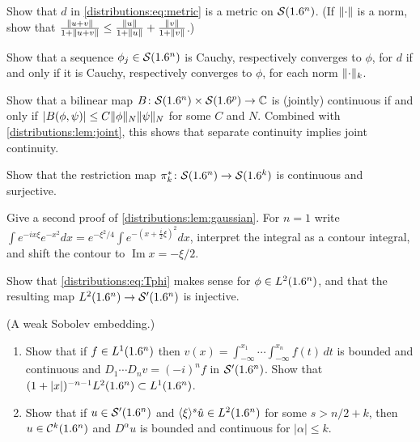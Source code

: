 \begin{exercise}\label{distributions:ex:metric}
Show that $d$ in \eqref{distributions:eq:metric} is a metric on $\mathcal{S}(1.6^n)$. (If
$\lVert \cdot\rVert$ is a norm, show that
$\frac{\lVert u+v\rVert}{1+\lVert u+v\rVert}\le\frac{\lVert u\rVert}{1+\lVert u\rVert}+\frac{\lVert v\rVert}{1+\lVert v\rVert}$.)
\end{exercise}

\begin{exercise}\label{distributions:ex:cauchy}
Show that a sequence $\phi_j\in\mathcal{S}(1.6^n)$ is Cauchy, respectively converges to $\phi$,
for $d$ if and only if it is Cauchy, respectively converges to $\phi$, for each norm
$\lVert \cdot\rVert_k$.
\end{exercise}

\begin{exercise}\label{distributions:ex:bilinear}
Show that a bilinear map $B\colon\mathcal{S}(1.6^n)\times\mathcal{S}(1.6^p)\to\mathbb{C}$ is (jointly) continuous
if and only if $|B(\phi,\psi)|\le C\lVert \phi\rVert_N\lVert \psi\rVert_N$ for some $C$ and $N$.
Combined with \cref{distributions:lem:joint}, this shows that separate continuity
implies joint continuity.
\end{exercise}

\begin{exercise}\label{distributions:ex:restriction}
Show that the restriction map $\pi_k^*\colon\mathcal{S}(1.6^n)\to\mathcal{S}(1.6^k)$ is continuous and
surjective.
\end{exercise}

\begin{exercise}\label{distributions:ex:gaussian-contour}
Give a second proof of \cref{distributions:lem:gaussian}. For $n=1$ write
$\int e^{-ix\xi}e^{-x^2}dx=e^{-\xi^2/4}\int e^{-(x+\frac i2\xi)^2}dx$, interpret the
integral as a contour integral, and shift the contour to $\operatorname{Im}x=-\xi/2$.
\end{exercise}

\begin{exercise}\label{distributions:ex:L2}
Show that \eqref{distributions:eq:Tphi} makes sense for $\phi\in L^2(1.6^n)$, and that the
resulting map $L^2(1.6^n)\to\mathcal{S}'(1.6^n)$ is injective.
\end{exercise}

\begin{exercise}\label{distributions:ex:sobolev}
(A weak Sobolev embedding.)
\begin{enumerate}[label=(\alph*)]
\item Show that if $f\in L^1(1.6^n)$ then
  $v(x)=\int_{-\infty}^{x_1}\cdots\int_{-\infty}^{x_n}f(t)\,dt$ is bounded and continuous
  and $D_1\cdots D_nv=(-i)^nf$ in $\mathcal{S}'(1.6^n)$. Show that
  $(1+|x|)^{-n-1}L^2(1.6^n)\subset L^1(1.6^n)$.
\item Show that if $u\in\mathcal{S}'(1.6^n)$ and $\langle \xi\rangle^s\hat u\in L^2(1.6^n)$ for some
  $s>n/2+k$, then $u\in\mathcal{C}^k(1.6^n)$ and $D^\alpha u$ is bounded and continuous for
  $|\alpha|\le k$.
\end{enumerate}
\end{exercise}

